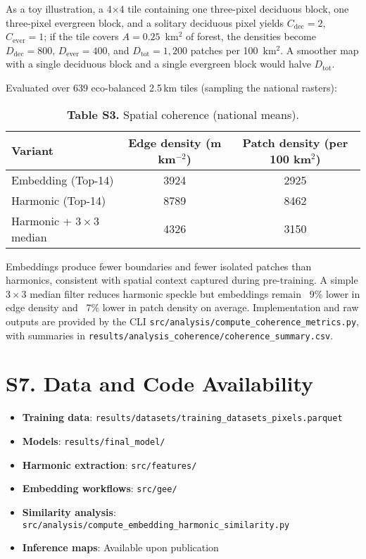 \documentclass[utf8]{frontiers_suppmat}
\begin{document}
As a toy illustration, a 4\(\times\)4 tile containing one three-pixel deciduous block, one three-pixel evergreen block, and a solitary deciduous pixel yields \(C_{\text{dec}}=2\), \(C_{\text{ever}}=1\); if the tile covers \(A=0.25\)~km\(^2\) of forest, the densities become \(D_{\text{dec}} = 800\), \(D_{\text{ever}} = 400\), and \(D_{\text{tot}} = 1{,}200\) patches per 100~km\(^2\). A smoother map with a single deciduous block and a single evergreen block would halve \(D_{\text{tot}}\).

Evaluated over 639 eco-balanced 2.5\,km tiles (sampling the national rasters):

\begin{table}[H]
    \centering
    \caption{\textbf{Table S3.} Spatial coherence (national means).}
    \begin{tabular}{lcc}
        \hline
        \textbf{Variant} & \textbf{Edge density (m km$^{-2}$)} & \textbf{Patch density (per 100 km$^{2}$)} \\ \hline
        Embedding (Top-14) & 3924 & 2925 \\
        Harmonic (Top-14) & 8789 & 8462 \\
        Harmonic + 3\,$\times$\,3 median & 4326 & 3150 \\ \hline
    \end{tabular}
\end{table}

Embeddings produce fewer boundaries and fewer isolated patches than harmonics, consistent with spatial context captured during pre-training. A simple 3\,$\times$\,3 median filter reduces harmonic speckle but embeddings remain ~9\% lower in edge density and ~7\% lower in patch density on average. Implementation and raw outputs are provided by the CLI \texttt{src/analysis/compute\_coherence\_metrics.py}, with summaries in \texttt{results/analysis\_coherence/coherence\_summary.csv}.

\section{S7. Data and Code Availability}

\begin{itemize}
    \item \textbf{Training data}: \texttt{results/datasets/training\_datasets\_pixels.parquet}
    \item \textbf{Models}: \texttt{results/final\_model/}
    \item \textbf{Harmonic extraction}: \texttt{src/features/}
    \item \textbf{Embedding workflows}: \texttt{src/gee/}
    \item \textbf{Similarity analysis}: \texttt{src/analysis/compute\_embedding\_harmonic\_similarity.py}
    \item \textbf{Inference maps}: Available upon publication
\end{itemize}
\end{document}
